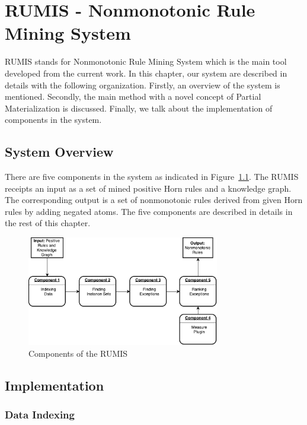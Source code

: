 \chapter{RUMIS - Nonmonotonic Rule Mining System}\label{chap:system}

RUMIS stands for Nonmonotonic Rule Mining System which is the main tool developed from the current work. In this chapter, our system are described in details with the following organization. Firstly, an overview of the system is mentioned. Secondly, the main method with a novel concept of Partial Materialization is discussed. Finally, we talk about the implementation of components in the system.

\section{System Overview}

There are five components in the system as indicated in Figure~\ref{system_overview}. The RUMIS receipts an input as a set of mined positive Horn rules and a knowledge graph. The corresponding output is a set of nonmonotonic rules derived from given Horn rules by adding negated atoms. The five components are described in details in the rest of this chapter.

\begin{figure}[ht]
\centering
\includegraphics[width=0.75\textwidth]{figures/system_overview}
\caption{Components of the RUMIS}
\label{system_overview}
\end{figure}

\section{Implementation}

\subsection{Data Indexing}

